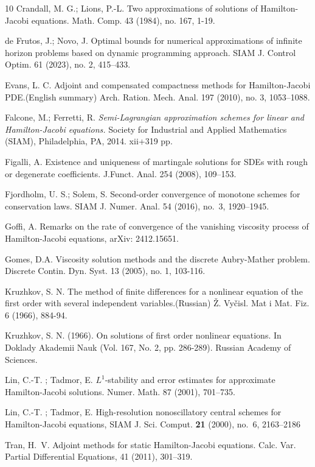 \documentclass[11pt]{amsart}
\theoremstyle{remark}
\theoremstyle{definition}
\theoremstyle{Claim}
\theoremstyle{plain}
\begin{document}
\begin{thebibliography}{10}
		Crandall, M. G.; Lions, P.-L.
		Two approximations of solutions of Hamilton-Jacobi equations.
		Math. Comp. 43 (1984), no. 167, 1-19.
		
		de Frutos, J.; Novo, J.
		Optimal bounds for numerical approximations of infinite horizon problems based on dynamic programming approach. 
		SIAM J. Control Optim. 61 (2023), no. 2, 415--433.
		
		 Evans, L. C. 
		 Adjoint and compensated compactness methods for Hamilton-Jacobi PDE.(English summary)
		 Arch. Ration. Mech. Anal. 197 (2010), no. 3, 1053--1088.
				
		Falcone, M.; Ferretti, R.
		\textit{Semi-Lagrangian approximation schemes for linear and Hamilton-Jacobi equations.}
		Society for Industrial and Applied Mathematics (SIAM), Philadelphia, PA, 2014. xii+319 pp.
		
		Figalli, A. Existence and uniqueness of martingale solutions for SDEs with rough or degenerate coefficients. J.Funct. Anal. 254 (2008), 109--153.
		
		Fjordholm, U. S.; Solem, S.
		Second-order convergence of monotone schemes for conservation laws.
		SIAM J. Numer. Anal. 54 (2016), no.~3, 1920--1945.
		
		Goffi, A. Remarks on the rate of convergence of the vanishing viscosity process of Hamilton-Jacobi equations, arXiv: 2412.15651.
		
		 Gomes, D.A. Viscosity solution methods and the discrete Aubry-Mather problem. 
		 Discrete Contin. Dyn. Syst. 13 (2005), no. 1, 103-116.
		
		Kruzhkov, S. N.
		The method of finite differences for a nonlinear equation of the first order with several independent variables.(Russian)
		Ž. Vyčisl. Mat i Mat. Fiz. 6 (1966), 884-94.

                     Kruzhkov, S. N. (1966). On solutions of first order nonlinear equations. In Doklady Akademii Nauk (Vol. 167, No. 2, pp. 286-289). Russian Academy of Sciences.
		
		Lin, C.-T. ; Tadmor, E.
	  {$L^1$}-stability and error estimates for approximate
		{H}amilton-{J}acobi solutions. Numer. Math.  87 (2001), 701--735.
		
		Lin, C.-T. ; Tadmor, E. High-resolution nonoscillatory central schemes for Hamilton-Jacobi equations, SIAM J. Sci. Comput. {\bf 21} (2000), no.~6, 2163--2186
	
		 Tran, H.~V. Adjoint methods for static {H}amilton-{J}acobi equations.
		 Calc. Var. Partial Differential Equations, 41 (2011), 301--319.
	\end{thebibliography}
	
	
\end{document}
